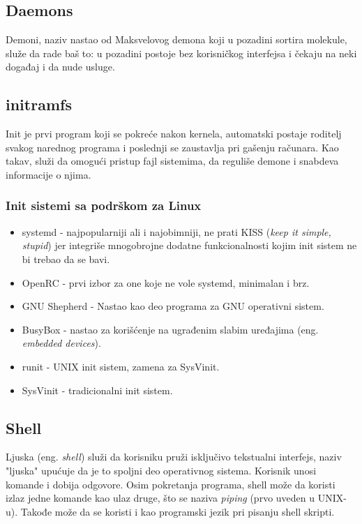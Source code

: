\documentclass[a4paper,14pt]{article}
\begin{document}
\subsection{Daemons}
Demoni\cite{daemon}, naziv nastao od Maksvelovog demona koji u pozadini sortira molekule, služe da rade baš to: u pozadini postoje bez korisničkog interfejsa i čekaju na neki događaj i da nude usluge.

\subsection{initramfs}
Init je prvi program koji se pokreće nakon kernela, automatski postaje roditelj svakog narednog programa i poslednji se zaustavlja pri gašenju računara. Kao takav, služi da omogući pristup fajl sistemima, da reguliše demone i snabdeva informacije o njima.
\subsubsection{Init sistemi sa podrškom za Linux}
\begin{itemize}
\item systemd - najpopularniji ali i najobimniji, ne prati KISS (\textit{keep it simple, stupid}) jer integriše mnogobrojne dodatne funkcionalnosti kojim init sistem ne bi trebao da se bavi.
\item OpenRC - prvi izbor za one koje ne vole systemd, minimalan i brz.
\item GNU Shepherd - Nastao kao deo programa za GNU operativni sistem.
\item BusyBox - nastao za korišćenje na ugrađenim slabim uređajima (eng. \textit{embedded devices}).
\item runit - UNIX init sistem, zamena za SysVinit.
\item SysVinit - tradicionalni init sistem.
\end{itemize}
\newpage

\subsection{Shell}
Ljuska (eng. \textit{shell}) služi da korisniku pruži isključivo tekstualni interfejs, naziv "ljuska" upućuje da je to spoljni deo operativnog sistema. Korisnik unosi komande i dobija odgovore. Osim pokretanja programa, shell može da koristi izlaz jedne komande kao ulaz druge, što se naziva \textit{piping} (prvo uveden u UNIX-u). Takođe može da se koristi i kao programski jezik pri pisanju shell skripti.
\end{document}

